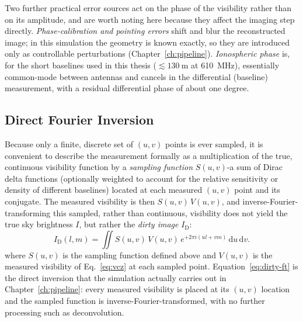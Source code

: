 Two further practical error sources act on the phase of the visibility rather
than on its amplitude, and are worth noting here because they affect the
imaging step directly. \emph{Phase-calibration and pointing errors} shift and
blur the reconstructed image; in this simulation the geometry is known
exactly, so they are introduced only as controllable perturbations
(Chapter~\ref{ch:pipeline}). \emph{Ionospheric phase} is, for the short
baselines used in this thesis ($\lesssim\SI{130}{\metre}$ at
\SI{610}{\mega\hertz}), essentially common-mode between antennas and cancels
in the differential (baseline) measurement, with a residual differential
phase of about one degree.

\subsection{Direct Fourier Inversion}
\label{subsec:fourier-inversion}
Because only a finite, discrete set of $(u,v)$ points is ever sampled, it is
convenient to describe the measurement formally as a multiplication of the
true, continuous visibility function by a \emph{sampling function} $S(u,v)$-a
sum of Dirac delta functions (optionally weighted to account for the relative
sensitivity or density of different baselines) located at each measured
$(u,v)$ point and its conjugate. The measured visibility is then
$S(u,v)\,V(u,v)$, and inverse-Fourier-transforming this sampled, rather than
continuous, visibility does not yield the true sky brightness $I$, but rather
the \emph{dirty image} $I_\mathrm{D}$:
\begin{equation}
  I_\mathrm{D}(l,m) = \iint S(u,v)\,V(u,v)\,e^{+2\pi i(ul+vm)}\,\mathrm{d}u\,\mathrm{d}v .
  \label{eq:dirty-ft}
\end{equation}
where $S(u,v)$ is the sampling function defined above and $V(u,v)$ is the
measured visibility of Eq.~\eqref{eq:vcz} at each sampled point.
Equation~\eqref{eq:dirty-ft} is the direct inversion that the simulation
actually carries out in Chapter~\ref{ch:pipeline}: every measured visibility
is placed at its $(u,v)$ location and the sampled function is
inverse-Fourier-transformed, with no further processing such as
deconvolution.

